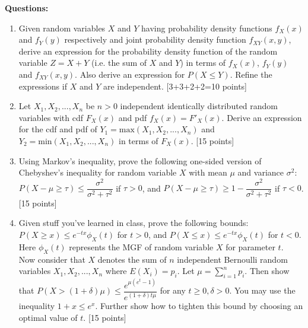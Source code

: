 \documentclass[11pt]{article}
\begin{document}
\textbf{Questions:}
\begin{enumerate}
\item Given random variables $X$ and $Y$ having probability density functions $f_X(x)$ and $f_Y(y)$ respectively and joint probability density function $f_{XY}(x,y)$, derive an expression for the probability density function of the random variable $Z = X+Y$ (i.e. the sum of $X$ and $Y$) in terms of $f_X(x)$, $f_Y(y)$ and $f_{XY}(x,y)$. Also derive an expression for $P(X \leq Y)$. Refine the expressions if $X$ and $Y$ are independent. \textsf{[3+3+2+2=10 points]}

\item Let $X_1, X_2, ..., X_n$ be $n > 0$ independent identically distributed random variables with cdf $F_X(x)$ and pdf $f_X(x) = F'_X(x)$. Derive an expression for the cdf and pdf of $Y_1 = \textrm{max}(X_1, X_2, ..., X_n)$ and $Y_2 = \textrm{min}(X_1, X_2, ..., X_n)$ in terms of $F_X(x)$. \textsf{[15 points]}

\item Using Markov's inequality, prove the following one-sided version of Chebyshev's inequality for random variable $X$ with mean $\mu$ and variance $\sigma^2$:
$P(X-\mu \geq \tau) \leq \dfrac{\sigma^2}{\sigma^2 + \tau^2}$ if $\tau > 0$, and $P(X-\mu \geq \tau) \geq 1-\dfrac{\sigma^2}{\sigma^2 + \tau^2}$ if $\tau < 0$. \textsf{[15 points]}

\item Given stuff you've learned in class, prove the following bounds: $P(X \geq x) \leq e^{-tx} \phi_X(t)$ for $t > 0$, and $P(X \leq x) \leq e^{-tx} \phi_X(t)$ for $t < 0$. Here $\phi_X(t)$ represents the MGF of random variable $X$ for parameter $t$. \\
Now consider that $X$ denotes the sum of $n$ independent Bernoulli random variables $X_1, X_2,...,X_n$ where $E(X_i) = p_i$. Let $\mu = \sum_{i=1}^n p_i$. Then show that $P(X > (1+\delta)\mu) \leq \dfrac{e^{\mu(e^t-1)}}{e^{(1+\delta)t\mu}}$ for any $t \geq 0, \delta > 0$. You may use the inequality $1+x \leq e^x$. Further show how to tighten this bound by choosing an optimal value of $t$.
\textsf{[15 points]}


\end{enumerate}
\end{document}
